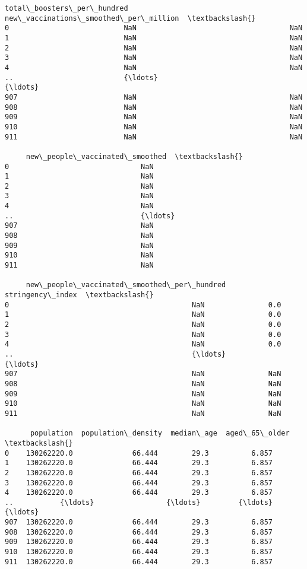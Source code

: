 \documentclass[11pt]{article}
\begin{document}
\begin{tcolorbox}[breakable, size=fbox, boxrule=.5pt, pad at break*=1mm, opacityfill=0]
\begin{Verbatim}[commandchars=\\\{\}]
     total\_boosters\_per\_hundred  new\_vaccinations\_smoothed\_per\_million  \textbackslash{}
0                           NaN                                    NaN
1                           NaN                                    NaN
2                           NaN                                    NaN
3                           NaN                                    NaN
4                           NaN                                    NaN
..                          {\ldots}                                    {\ldots}
907                         NaN                                    NaN
908                         NaN                                    NaN
909                         NaN                                    NaN
910                         NaN                                    NaN
911                         NaN                                    NaN

     new\_people\_vaccinated\_smoothed  \textbackslash{}
0                               NaN
1                               NaN
2                               NaN
3                               NaN
4                               NaN
..                              {\ldots}
907                             NaN
908                             NaN
909                             NaN
910                             NaN
911                             NaN

     new\_people\_vaccinated\_smoothed\_per\_hundred  stringency\_index  \textbackslash{}
0                                           NaN               0.0
1                                           NaN               0.0
2                                           NaN               0.0
3                                           NaN               0.0
4                                           NaN               0.0
..                                          {\ldots}               {\ldots}
907                                         NaN               NaN
908                                         NaN               NaN
909                                         NaN               NaN
910                                         NaN               NaN
911                                         NaN               NaN

      population  population\_density  median\_age  aged\_65\_older  \textbackslash{}
0    130262220.0              66.444        29.3          6.857
1    130262220.0              66.444        29.3          6.857
2    130262220.0              66.444        29.3          6.857
3    130262220.0              66.444        29.3          6.857
4    130262220.0              66.444        29.3          6.857
..           {\ldots}                 {\ldots}         {\ldots}            {\ldots}
907  130262220.0              66.444        29.3          6.857
908  130262220.0              66.444        29.3          6.857
909  130262220.0              66.444        29.3          6.857
910  130262220.0              66.444        29.3          6.857
911  130262220.0              66.444        29.3          6.857


\end{Verbatim}
\end{tcolorbox}
\end{document}
